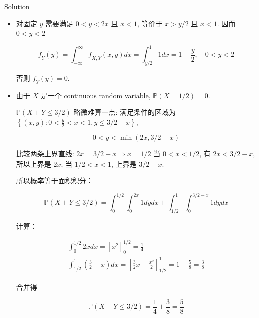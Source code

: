 \begin{qlsolution}{Solution}

\begin{itemize}
\item
  对固定 \(\mathit{y}\) 需要满足 \(0 < \mathit{y} < 2\mathit{x}\) 且 \(\mathit{x} < 1\), 等价于 \(\mathit{x} > \mathit{y}/2\) 且 \(\mathit{x} < 1\). 因而 \(0 < \mathit{y} < 2\)

  \[\mathit{f}_{\mathit{Y}}(\mathit{y}) = \int_{- \infty}^{\infty}\mathit{f}_{\mathit{X},\mathit{Y}}(\mathit{x},\mathit{y})\mathit{d}\mathit{x} = \int_{\mathit{y}/2}^{1}1\mathit{d}\mathit{x} = 1 - \frac{\mathit{y}}{2},\quad 0 < \mathit{y} < 2\]

  否则 \(\mathit{f}_{\mathit{Y}}(\mathit{y}) = 0\).
\item
  由于 \(\mathit{X}\) 是一个 continuous random variable, \(\mathbb{P}(\mathit{X} = 1/2) = 0\).

  \(\mathbb{P}(\mathit{X} + \mathit{Y} \leq 3/2)\) 略微难算一点: 满足条件的区域为 \(\left\{ {(\mathit{x},\mathit{y}):0 < \frac{\mathit{y}}{2} < \mathit{x} < 1,\mathit{y} \leq 3/2 - \mathit{x}} \right\}\),

  \[0 < \mathit{y} < \min(2\mathit{x},3/2 - \mathit{x})\]

  比较两条上界直线: \(2\mathit{x} = 3/2 - \mathit{x}\Rightarrow\mathit{x} = 1/2\) 当 \(0 < \mathit{x} < 1/2\), 有 \(2\mathit{x} < 3/2 - \mathit{x}\), 所以上界是 \(2\mathit{x}\); 当 \(1/2 < \mathit{x} < 1\), 上界是 \(3/2 - \mathit{x}\).

  所以概率等于面积积分：

  \[\mathbb{P}(\mathit{X} + \mathit{Y} \leq 3/2) = \int_{0}^{1/2}\int_{0}^{2\mathit{x}}1\mathit{d}\mathit{y}\mathit{d}\mathit{x} + \int_{1/2}^{1}\int_{0}^{3/2 - \mathit{x}}1\mathit{d}\mathit{y}\mathit{d}\mathit{x}\]

  计算：

  \[\begin{matrix}
  {\int_{0}^{1/2}2\mathit{x}\mathit{d}\mathit{x} = \left\lbrack \mathit{x}^{2} \right\rbrack_{0}^{1/2} = \frac{1}{4}} \\
  {\int_{1/2}^{1}\left( {\frac{3}{2} - \mathit{x}} \right)\mathit{d}\mathit{x} = \left\lbrack {\frac{3}{2}\mathit{x} - \frac{\mathit{x}^{2}}{2}} \right\rbrack_{1/2}^{1} = 1 - \frac{5}{8} = \frac{3}{8}}
  \end{matrix}\]

  合并得

  \[\mathbb{P}(\mathit{X} + \mathit{Y} \leq 3/2) = \frac{1}{4} + \frac{3}{8} = \frac{5}{8}\]


\end{itemize}
\end{qlsolution}

